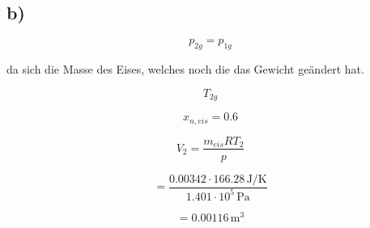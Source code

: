

\subsection*{b)}

\[
p_{2g} = p_{1g}
\]

da sich die Masse des Eises, welches noch die das Gewicht geändert hat.

\[
T_{2g}
\]

\[
x_{n,eis} = 0.6
\]

\[
V_2 = \frac{m_{eis} RT_2}{p}
\]

\[
= \frac{0.00342 \cdot 166.28 \, \text{J/K}}{1.401 \cdot 10^5 \, \text{Pa}}
\]

\[
= 0.00116 \, \text{m}^3
\]